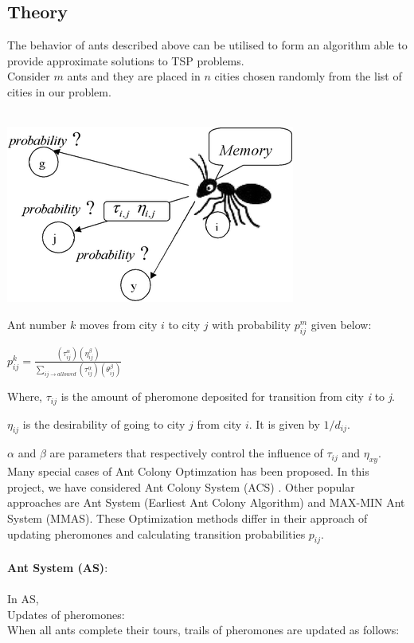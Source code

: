 \documentclass[11pt, english]{article}
\begin{document}
\subsection{Theory}

The behavior of ants described above can be utilised to form an algorithm able to provide approximate solutions to TSP problems.\\

\noindent
Consider $m$ ants and they are placed in $n$ cities chosen randomly from the list of cities in our problem.\\
\\
\begin{center}
\includegraphics[scale=0.5]{ant.png}
\end{center}

\noindent
Ant number $k$ moves from city $i$ to city $j$ with probability $p_{ij}^m$ given below:

\begin{center}
$p_{ij}^k = \frac{{(\tau_{ij}^\alpha)(\eta_{ij}^\beta)}}{\sum_{ij \rightarrow allowed}{(\tau_{ij}^\alpha)(\theta_{ij}^\beta)}}$
\end{center}
\noindent
Where, $\tau_{ij}$ is the amount of pheromone deposited for transition from city \emph{i} to \emph{j}.

\tab  $\eta _{ij}$ is the desirability of going to city ${j}$ from city ${i}$. It is given by ${1/d_{ij}}$.

\tab $\alpha$ and $\beta$ are parameters that respectively control the influence of $\tau_{ij}$ and $\eta _{xy}$.\\

\noindent
Many special cases of Ant Colony Optimzation has been proposed. In this project, we have considered Ant Colony System (ACS) \cite{Dorigo1997}. Other popular approaches are Ant System (Earliest Ant Colony Algorithm)\cite{Dorigo06antcolony} and MAX-MIN Ant System (MMAS)\cite{Sttzle1998}. These Optimization methods differ in their approach of updating pheromones and calculating transition probabilities $p_{ij}$. \\
\\
\noindent
{\bf Ant System (AS)}:\\
\\
In AS,\\
\noindent
Updates of pheromones:\\ 
When all ants complete their tours, trails of pheromones are updated as follows:
\end{document}
